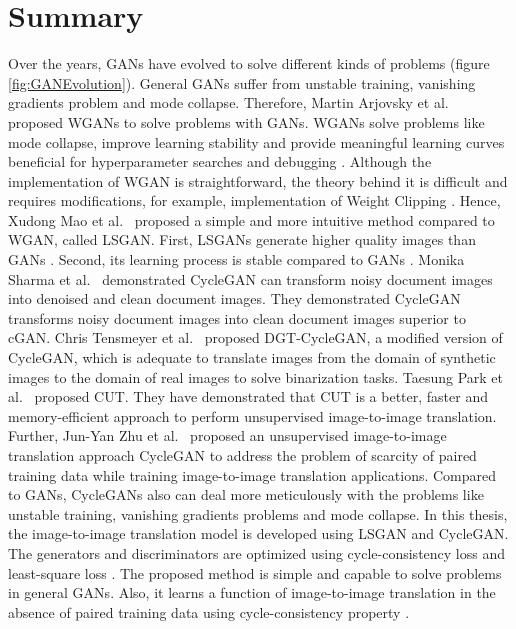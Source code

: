 \section{Summary}\label{rwsummary}
Over the years, \acp{GAN} have evolved to solve different kinds of problems (figure \ref{fig:GANEvolution}). General \acp{GAN} suffer from unstable training, vanishing gradients problem and mode collapse. Therefore, Martin Arjovsky et al.\ \cite{arjovsky2017wasserstein} proposed \acp{WGAN} to solve problems with \acp{GAN}. \acp{WGAN} solve problems like mode collapse, improve learning stability and provide meaningful learning curves beneficial for hyperparameter searches and debugging \cite{arjovsky2017wasserstein}. Although the implementation of \ac{WGAN} is straightforward, the theory behind it is difficult and requires modifications, for example, implementation of Weight Clipping \cite{gulrajani2017improved}. Hence, Xudong Mao et al.\ \cite{mao2017squares} proposed a simple and more intuitive method compared to \ac{WGAN}, called \ac{LSGAN}. First, \acp{LSGAN} generate higher quality images than \acp{GAN} \cite{mao2017squares}. Second, its learning process is stable compared to \acp{GAN} \cite{mao2017squares}. Monika Sharma et al.\ \cite{sharma2019learning} demonstrated \ac{CycleGAN} can transform noisy document images into denoised and clean document images. They demonstrated \ac{CycleGAN} transforms noisy document images into clean document images superior to \ac{cGAN}. Chris Tensmeyer et al.\ \cite{8978087} proposed DGT-CycleGAN, a modified version of \ac{CycleGAN}, which is adequate to translate images from the domain of synthetic images to the domain of real images to solve binarization tasks. Taesung Park et al.\ \cite{park2020contrastive} proposed \ac{CUT}. They have demonstrated that \ac{CUT} is a better, faster and memory-efficient approach to perform unsupervised image-to-image translation. Further, Jun-Yan Zhu et al.\ \cite{zhu2020unpaired} proposed an unsupervised image-to-image translation approach \ac{CycleGAN} to address the problem of scarcity of paired training data while training image-to-image translation applications. Compared to \acp{GAN}, \acp{CycleGAN} also can deal more meticulously with the problems like unstable training, vanishing gradients problems and mode collapse. In this thesis, the image-to-image translation model is developed using \ac{LSGAN} and \ac{CycleGAN}. The generators and discriminators are optimized using cycle-consistency loss \cite{zhu2020unpaired} and least-square loss \cite{mao2017squares}. The proposed method is simple and capable to solve problems in general \acp{GAN}. Also, it learns a function of image-to-image translation in the absence of paired training data using cycle-consistency property \cite{zhu2020unpaired}.



